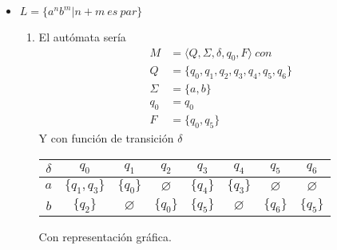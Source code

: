 \documentclass{article}
\begin{document}
\begin{enumerate}
{\begin{itemize}
                \item $L = \{a^{n} b^{m} | n + m \ es\ par \}$
                \begin{enumerate}
                	\item {
                		El autómata sería
                		\begin{align*}
                		M &= \langle Q, \Sigma, \delta, q_{0}, F \rangle \ con\\
                		Q &= \{q_{0}, q_{1}, q_{2}, q_{3}, q_{4}, q_{5}, q_{6}\} \\
                		\Sigma &= \{a, b\} \\
                		q_{0} &= q_{0} \\
                		F &= \{q_{0}, q_{5}\}
                		\end{align*}
                		Y con función de transición $\delta$
                		
                		\begin{table}[H]
                			\centering
                			\begin{tabular}{|c|c|c|c|c|c|c|c|}
                				\hline
                				$\delta$ & $q_{0}$ & $q_{1}$ & $q_{2}$ & $q_{3}$ & $q_{4}$ & $q_{5}$ & $q_{6}$ \\
                				\hline
                				$a$ & $\{q_{1}, q_{3}\}$ & $\{q_{0}\}$ & $\varnothing$ & $\{q_{4}\}$ & $\{q_{3}\}$ & $\varnothing$ & $\varnothing$ \\
                				\hline
                				$b$ & $\{q_{2}\}$ & $\varnothing$ & $\{q_{0}\}$ & $\{q_{5}\}$  & $\varnothing$ & $\{q_{6}\}$ & $\{q_{5}\}$ \\
                				\hline
                			\end{tabular}
                		\end{table}
                		
                		Con representación gráfica.
                		\begin{center}
                		\begin{figure}[H]
                			\centering
\end{figure}
\end{center}}
\end{enumerate}
\end{itemize}}
\end{enumerate}
\end{document}
